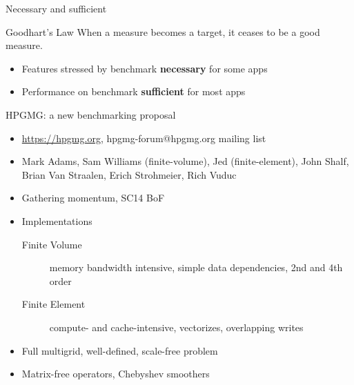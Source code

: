 \documentclass{beamer}
\begin{document}
\begin{frame}{Necessary and sufficient}
  \begin{block}{Goodhart's Law}
    When a measure becomes a target, it ceases to be a good measure.
  \end{block}

  \begin{itemize}
  \item Features stressed by benchmark \textbf{necessary} for some apps
  \item Performance on benchmark \textbf{sufficient} for most apps
  \end{itemize}
\end{frame}

\begin{frame}{HPGMG: a new benchmarking proposal}
  \begin{itemize}
  \item \url{https://hpgmg.org}, hpgmg-forum@hpgmg.org mailing list
  \item Mark Adams, Sam Williams (finite-volume), Jed (finite-element), John Shalf, Brian Van Straalen, Erich Strohmeier, Rich Vuduc
  \item Gathering momentum, SC14 BoF
  \item Implementations
    \begin{description}
    \item[Finite Volume] memory bandwidth intensive, simple data dependencies, 2nd and 4th order
    \item[Finite Element] compute- and cache-intensive, vectorizes, overlapping writes
    \end{description}
  \item Full multigrid, well-defined, scale-free problem
  \item Matrix-free operators, Chebyshev smoothers
  \end{itemize}
\end{frame}
\end{document}
